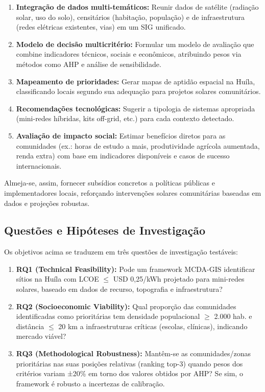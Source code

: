\documentclass[12pt, a4paper]{article}
\begin{document}
\begin{enumerate}
\item \textbf{Integração de dados multi-temáticos:} Reunir dados de satélite (radiação solar, uso do solo), censitários (habitação, população) e de infraestrutura (redes elétricas existentes, vias) em um SIG unificado.
\item \textbf{Modelo de decisão multicritério:} Formular um modelo de avaliação que combine indicadores técnicos, sociais e econômicos, atribuindo pesos via métodos como AHP e análise de sensibilidade.
\item \textbf{Mapeamento de prioridades:} Gerar mapas de aptidão espacial na Huíla, classificando locais segundo sua adequação para projetos solares comunitários.
\item \textbf{Recomendações tecnológicas:} Sugerir a tipologia de sistemas apropriada (mini-redes híbridas, kits off-grid, etc.) para cada contexto detectado.
\item \textbf{Avaliação de impacto social:} Estimar benefícios diretos para as comunidades (ex.: horas de estudo a mais, produtividade agrícola aumentada, renda extra) com base em indicadores disponíveis e casos de sucesso internacionais.
\end{enumerate}

Almeja-se, assim, fornecer subsídios concretos a políticas públicas e implementadores locais, reforçando intervenções solares comunitárias baseadas em dados e projeções robustas.

\subsection{Questões e Hipóteses de Investigação}

Os objetivos acima se traduzem em três questões de investigação testáveis:

\begin{enumerate}
\item \textbf{RQ1 (Technical Feasibility):} Pode um framework MCDA-GIS identificar sítios na Huíla com LCOE $\leq$ USD 0,25/kWh projetado para mini-redes solares, baseado em dados de recurso, topografia e infraestrutura?

\item \textbf{RQ2 (Socioeconomic Viability):} Qual proporção das comunidades identificadas como prioritárias tem densidade populacional $\geq$ 2.000 hab. e distância $\leq$ 20 km a infraestruturas críticas (escolas, clínicas), indicando mercado viável?

\item \textbf{RQ3 (Methodological Robustness):} Mantêm-se as comunidades/zonas prioritárias nas suas posições relativas (ranking top-3) quando pesos dos critérios variam ±20\% em torno dos valores obtidos por AHP? Se sim, o framework é robusto a incertezas de calibração.
\end{enumerate}
\end{document}
